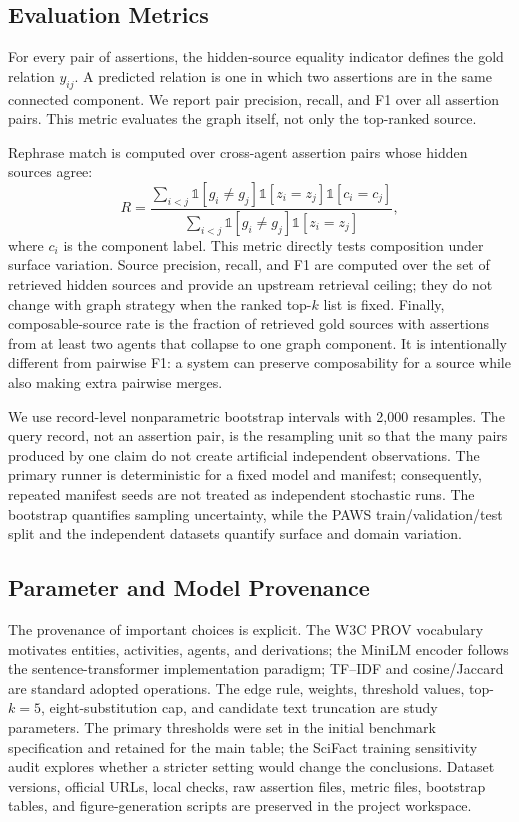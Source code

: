 \documentclass{ieeeaccess}
\begin{document}
\subsection{Evaluation Metrics}
For every pair of assertions, the hidden-source equality indicator defines the gold relation $y_{ij}$. A predicted relation is one in which two assertions are in the same connected component. We report pair precision, recall, and F1 over all assertion pairs. This metric evaluates the graph itself, not only the top-ranked source.

Rephrase match is computed over cross-agent assertion pairs whose hidden sources agree:
\begin{equation}
 R=\frac{\sum_{i<j}\mathbb{1}[g_i\ne g_j]\mathbb{1}[z_i=z_j]\mathbb{1}[c_i=c_j]}{\sum_{i<j}\mathbb{1}[g_i\ne g_j]\mathbb{1}[z_i=z_j]},
 \label{eq:rephrase}
\end{equation}
where $c_i$ is the component label. This metric directly tests composition under surface variation. Source precision, recall, and F1 are computed over the set of retrieved hidden sources and provide an upstream retrieval ceiling; they do not change with graph strategy when the ranked top-$k$ list is fixed. Finally, composable-source rate is the fraction of retrieved gold sources with assertions from at least two agents that collapse to one graph component. It is intentionally different from pairwise F1: a system can preserve composability for a source while also making extra pairwise merges.

We use record-level nonparametric bootstrap intervals with 2,000 resamples. The query record, not an assertion pair, is the resampling unit so that the many pairs produced by one claim do not create artificial independent observations. The primary runner is deterministic for a fixed model and manifest; consequently, repeated manifest seeds are not treated as independent stochastic runs. The bootstrap quantifies sampling uncertainty, while the PAWS train/validation/test split and the independent datasets quantify surface and domain variation.

\subsection{Parameter and Model Provenance}
The provenance of important choices is explicit. The W3C PROV vocabulary motivates entities, activities, agents, and derivations; the MiniLM encoder follows the sentence-transformer implementation paradigm; TF--IDF and cosine/Jaccard are standard adopted operations. The edge rule, weights, threshold values, top-$k=5$, eight-substitution cap, and candidate text truncation are study parameters. The primary thresholds were set in the initial benchmark specification and retained for the main table; the SciFact training sensitivity audit explores whether a stricter setting would change the conclusions. Dataset versions, official URLs, local checks, raw assertion files, metric files, bootstrap tables, and figure-generation scripts are preserved in the project workspace.
\end{document}
